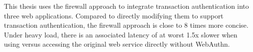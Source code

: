 This thesis uses the firewall approach to integrate transaction authentication into three web applications. Compared to directly modifying them to support transaction authentication, the firewall approach is close to 8 times more concise. Under heavy load, there is an associated latency of at worst 1.5x slower when using \sys{} versus accessing the original web service directly without WebAuthn.

